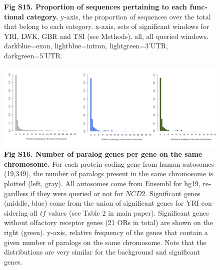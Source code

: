 \begin{refsection}
\begin{otherlanguage}{english}
\begin{figure}[h]
\caption*{\textbf{Fig S15. Proportion of sequences pertaining to each functional category.}
y-axis, the proportion of sequences over the total that belong to each category. x-axis, sets of significant windows for YRI, LWK, GBR and TSI (see Methods). all, all queried windows. darkblue=exon, lightblue=intron, lightgreen=3’UTR, darkgreen=5’UTR.
}
\end{figure}
%
\newpage
\begin{figure}
\centering
\includegraphics[]{chap2_folder/supp_figures/S16_Fig.png}
\caption*{\textbf{Fig S16. Number of paralog genes per gene on the same chromosome.}
For each protein-coding gene from human autosomes (19,349), the number of paralogs present in the same chromosome is plotted (left, gray). All autosomes come from Ensembl for hg19, regardless if they were queried or not for $NCD2$. Significant genes (middle, blue) come from the union of significant genes for YRI considering all $tf$ values (see Table 2 in main paper). Significant genes without olfactory receptor genes (21 ORs in total) are shown on the right (green). y-axis, relative frequency of the genes that contain a given number of paralogs on the same chromosome. Note that the distributions are very similar for the background and significant genes.
}
\end{figure}


\end{otherlanguage}
\end{refsection}
